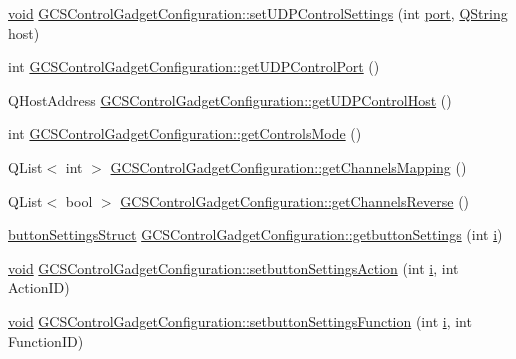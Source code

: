 \begin{DoxyCompactItemize}
\item 
\hyperlink{group___u_a_v_objects_plugin_ga444cf2ff3f0ecbe028adce838d373f5c}{void} \hyperlink{group___g_c_s_control_gadget_plugin_ga3bcc78712b1d750a1426bd1342f0897a}{\-G\-C\-S\-Control\-Gadget\-Configuration\-::set\-U\-D\-P\-Control\-Settings} (int \hyperlink{classport}{port}, \hyperlink{group___u_a_v_objects_plugin_gab9d252f49c333c94a72f97ce3105a32d}{\-Q\-String} host)
\item 
int \hyperlink{group___g_c_s_control_gadget_plugin_gab4759362f125b28eca65edb170d6d179}{\-G\-C\-S\-Control\-Gadget\-Configuration\-::get\-U\-D\-P\-Control\-Port} ()
\item 
\-Q\-Host\-Address \hyperlink{group___g_c_s_control_gadget_plugin_ga3d756308c4f352759b919076507be2de}{\-G\-C\-S\-Control\-Gadget\-Configuration\-::get\-U\-D\-P\-Control\-Host} ()
\item 
int \hyperlink{group___g_c_s_control_gadget_plugin_ga4604101049b278a5e919fa1bcbba4a74}{\-G\-C\-S\-Control\-Gadget\-Configuration\-::get\-Controls\-Mode} ()
\item 
\-Q\-List$<$ int $>$ \hyperlink{group___g_c_s_control_gadget_plugin_gad8ea955332edf856259dc191fdca5473}{\-G\-C\-S\-Control\-Gadget\-Configuration\-::get\-Channels\-Mapping} ()
\item 
\-Q\-List$<$ bool $>$ \hyperlink{group___g_c_s_control_gadget_plugin_ga643521630f66ed868de507d649278971}{\-G\-C\-S\-Control\-Gadget\-Configuration\-::get\-Channels\-Reverse} ()
\item 
\hyperlink{structbutton_settings_struct}{button\-Settings\-Struct} \hyperlink{group___g_c_s_control_gadget_plugin_ga024292274c2307cd9e45e6a7fbbba208}{\-G\-C\-S\-Control\-Gadget\-Configuration\-::getbutton\-Settings} (int \hyperlink{uavobjecttemplate_8m_a6f6ccfcf58b31cb6412107d9d5281426}{i})
\item 
\hyperlink{group___u_a_v_objects_plugin_ga444cf2ff3f0ecbe028adce838d373f5c}{void} \hyperlink{group___g_c_s_control_gadget_plugin_ga59dbcf37f9417c485b9c8a021563a530}{\-G\-C\-S\-Control\-Gadget\-Configuration\-::setbutton\-Settings\-Action} (int \hyperlink{uavobjecttemplate_8m_a6f6ccfcf58b31cb6412107d9d5281426}{i}, int \-Action\-I\-D)
\item 
\hyperlink{group___u_a_v_objects_plugin_ga444cf2ff3f0ecbe028adce838d373f5c}{void} \hyperlink{group___g_c_s_control_gadget_plugin_ga67d36d085e0ada006406d7cd2569e226}{\-G\-C\-S\-Control\-Gadget\-Configuration\-::setbutton\-Settings\-Function} (int \hyperlink{uavobjecttemplate_8m_a6f6ccfcf58b31cb6412107d9d5281426}{i}, int \-Function\-I\-D)

\end{DoxyCompactItemize}
